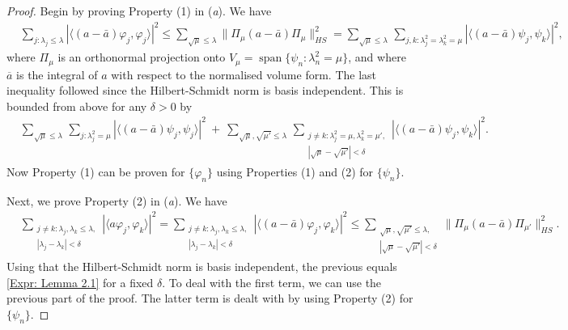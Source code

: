 \documentclass[11pt,twoside,reqno]{amsart}
\renewcommand{\phi}{\varphi}
\newcommand{\1}{\mathrm{\mathbf{1}}}
\numberwithin{equation}{section}
\theoremstyle{plain}
\theoremstyle{definition}
\theoremstyle{remark}
\begin{document}
\begin{proof}

    Begin by proving Property (1) in (\emph{a}). We have
    \begin{align*}
        &
        \sum_{ j : \lambda_j \leq \lambda } | \langle (a - \bar{a}) \phi_j, \phi_j \rangle |^2 \leq \sum_{ \sqrt{\mu} \leq \lambda } \| \Pi_\mu (a - \bar{a}) \Pi_\mu \|_{HS}^2 = \sum_{ \sqrt{\mu} \leq \lambda } \, \sum_{ j,k: \lambda_j^2 = \lambda_k^2 = \mu } | \langle (a - \bar{a}) \psi_j, \psi_k \rangle |^2,
    \end{align*}
    where $\Pi_\mu$ is an orthonormal projection onto $V_\mu = \operatorname{span} \{  \psi_n : \lambda_n^2 = \mu \}$, and where $\overline{a}$ is the integral of $a$ with respect to the normalised volume form. The last inequality followed since the Hilbert-Schmidt norm is basis independent. This is bounded from above for any $\delta > 0$ by
    \begin{align}
        &
        \label{Expr: Lemma 2.1}
        \sum_{\sqrt{\mu} \leq \lambda } \, \sum_{j : \lambda_j^2 = \mu} | \langle (a - \bar{a}) \psi_j, \psi_j \rangle |^2 \ + \  \sum_{ \sqrt{\mu}, \sqrt{\mu'} \leq \lambda } \, \sum_{ \substack{  j \neq k: \lambda_j^2 = \mu, \lambda_k^2 = \mu', \\ | \sqrt{\mu} - \sqrt{\mu'}| < \delta} } | \langle (a - \bar{a}) \psi_j, \psi_k \rangle |^2.
    \end{align}
    Now Property (1) can be proven for $\{ \phi_n \}$ using Properties (1) and (2) for $\{ \psi_n\}$.

    Next, we prove Property (2) in (\emph{a}). We have
    \begin{align*}
        &
        \sum_{ \substack{ j \neq k : \lambda_j , \lambda_k \leq \lambda, \\ | \lambda_j - \lambda_k | < \delta} } | \langle a \phi_j, \phi_k  \rangle |^2 = \sum_{ \substack{ j \neq k : \lambda_j , \lambda_k \leq \lambda, \\ | \lambda_j - \lambda_k | < \delta} } | \langle (a - \bar{a}) \phi_j, \phi_k  \rangle |^2 \leq  \sum_{ \substack{\sqrt{\mu}, \sqrt{\mu'} \leq \lambda, \\ | \sqrt{\mu}  - \sqrt{\mu'} | < \delta } }  \| \Pi_\mu (a - \bar{a}) \Pi_{\mu'} \|_{HS}^2.
    \end{align*}
    Using that the Hilbert-Schmidt norm is basis independent, the previous equals \eqref{Expr: Lemma 2.1} for a fixed $\delta$. To deal with the first term, we can use the previous part of the proof. The latter term is dealt with by using Property (2) for $\{  \psi_n\}$.


\end{proof}
\end{document}
